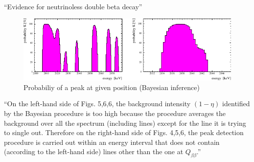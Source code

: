 \begin{frame}{\enquote{Evidence for neutrinoless double beta decay}}
	\begin{figure}[htpb]
		\centering
		\includegraphics[width=\textwidth]{media/hm_prob.pdf}
		\caption*{Probabiliy of a peak at given position (Bayesian inference)}%
	\end{figure}
	\vspace{-1em}
	\pause
	\enquote{\footnotesize On the left-hand side of Figs. 5,6,6, the background intensity $(1-\eta)$ identified
		by the Bayesian procedure is too high because the procedure averages
		the background over all the spectrum (including lines) except for the line it is
		trying to single out. Therefore on the right-hand side of Figs. 4,5,6, the peak
		detection procedure is carried out within an energy interval that does not contain
		(according to the left-hand side) lines other than the one at $Q_{ββ}$.}
\end{frame}
